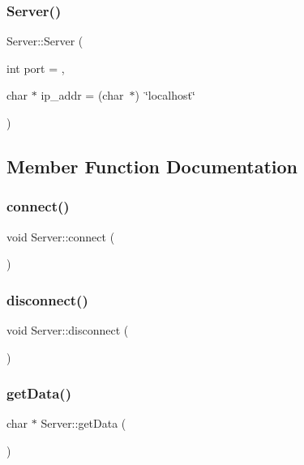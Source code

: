 \subsubsection{\texorpdfstring{Server()}{Server()}}
{\footnotesize\ttfamily Server\+::\+Server (\begin{DoxyParamCaption}\item[{int}]{port = {},  }\item[{char $\ast$}]{ip\+\_\+addr = {\ttfamily (char~$\ast$)~\char`\"{}localhost\char`\"{}} }\end{DoxyParamCaption})}



\subsection{Member Function Documentation}
\mbox{\label{classServer_a0bd7069e79b4d5268f0947079e1af54a}} 
\subsubsection{\texorpdfstring{connect()}{connect()}}
{\footnotesize\ttfamily void Server\+::connect (\begin{DoxyParamCaption}{ }\end{DoxyParamCaption})}

\mbox{\label{classServer_acd0114484495cfd2749816ddb12e4246}} 
\subsubsection{\texorpdfstring{disconnect()}{disconnect()}}
{\footnotesize\ttfamily void Server\+::disconnect (\begin{DoxyParamCaption}{ }\end{DoxyParamCaption})}

\mbox{\label{classServer_a6b6c39b02aeae611dcb2a9f2f5a8d801}} 
\subsubsection{\texorpdfstring{get\+Data()}{getData()}}
{\footnotesize\ttfamily char $\ast$ Server\+::get\+Data (\begin{DoxyParamCaption}{ }\end{DoxyParamCaption})}

